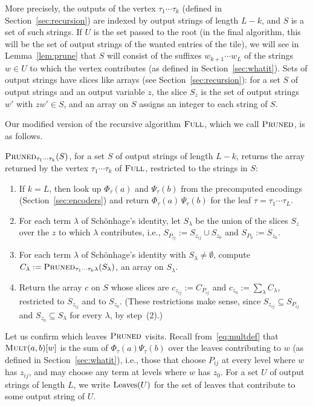More precisely, the outputs of the vertex $\tau_1\cdots\tau_k$ (defined in Section~\ref{sec:recursion}) are indexed by output strings of length $L-k$, and $S$ is a set of such strings. If $U$ is the set passed to the root (in the final algorithm, this will be the set of output strings of the wanted entries of the tile), we will see in Lemma~\ref{lem:prune} that $S$ will consist of the suffixes $w_{k+1}\cdots w_L$ of the strings $w\in U$ to which the vertex contributes (as defined in Section~\ref{sec:whatit}). 
Sets of output strings have slices like arrays (see Section~\ref{sec:recursion}): for a set $S$ of output strings and an output variable $z$, the slice $S_z$ is the set of output strings $w'$ with $zw'\in S$, and an array on $S$ assigns an integer to each string of $S$.

Our modified version of the recursive algorithm $\textnormal{\textsc{Full}}$, which we call $\textnormal{\textsc{Pruned}}$, is as follows.

\medskip
\noindent\begin{minipage}[t]{\linewidth}
$\textnormal{\textsc{Pruned}}_{\tau_1\cdots\tau_k}(S)$, for a set $S$ of output strings of length $L-k$, returns the array returned by the vertex $\tau_1\cdots\tau_k$ of $\textnormal{\textsc{Full}}$, restricted to the strings in $S$:
\begin{enumerate}[label=(\arabic*),nosep]
\item If $k=L$, then look up $\Phi_\tau(a)$ and $\Psi_\tau(b)$ from the precomputed encodings (Section~\ref{sec:encoders}) and return $\Phi_\tau(a)\,\Psi_\tau(b)$ for the leaf $\tau=\tau_1\cdots\tau_L$.
\item For each term $\lambda$ of Sch\"onhage's identity, let $S_\lambda$ be the union of the slices $S_z$ over the $z$ to which $\lambda$ contributes, i.e., $S_{P_{ij}}:=S_{z_{ij}}\cup S_{z_0}$ and $S_{P_0}:=S_{z_0}$.
\item For each term $\lambda$ of Sch\"onhage's identity with $S_\lambda\ne\emptyset$, compute $C_\lambda:=\textnormal{\textsc{Pruned}}_{\tau_1\cdots\tau_k\lambda}(S_\lambda)$, an array on $S_\lambda$.
\item Return the array $c$ on $S$ whose slices are $c_{z_{ij}}:=C_{P_{ij}}$ and $c_{z_0}:=\sum_\lambda C_\lambda$, restricted to $S_{z_{ij}}$ and to $S_{z_0}$. (These restrictions make sense, since $S_{z_{ij}}\subseteq S_{P_{ij}}$ and $S_{z_0}\subseteq S_\lambda$ for every $\lambda$, by step~(2).)
\end{enumerate}
\end{minipage}
\medskip

Let us confirm which leaves $\textnormal{\textsc{Pruned}}$ visits. Recall from~\eqref{eq:multdef} that $\textnormal{\textsc{Mult}}(a,b)[w]$ is the sum of $\Phi_\tau(a)\Psi_\tau(b)$ over the leaves contributing to $w$ (as defined in Section~\ref{sec:whatit}), i.e., those that choose $P_{ij}$ at every level where $w$ has $z_{ij}$, and may choose any term at levels where $w$ has $z_0$. For a set $U$ of output strings of length $L$, we write $\mathrm{Leaves}(U)$ for the set of leaves that contribute to some output string of $U$.

